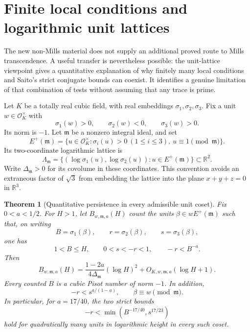 \documentclass[11pt,a4paper]{article}
\newtheorem{theorem}{Theorem}[section]
\theoremstyle{definition}\newtheorem{definition}[theorem]{Definition}
\theoremstyle{remark}\newtheorem{remark}[theorem]{Remark}
\begin{document}
\section{Finite local conditions and logarithmic unit lattices}
\label{pis:transfer:sec:rayunits}

The new non-Mills material does not supply an additional proved route to
Mills transcendence. A useful transfer is nevertheless possible: the
unit-lattice viewpoint gives a quantitative explanation of why finitely
many local conditions and Saito's strict conjugate bounds can coexist.
It identifies a genuine limitation of that combination of tests without
assuming that any trace is prime.

Let $K$ be a totally real cubic field, with real embeddings
$\sigma_1,\sigma_2,\sigma_3$. Fix a unit $w\in\mathcal O_K^\times$ with
\[
 \sigma_1(w)>0,\qquad \sigma_2(w)<0,\qquad \sigma_3(w)>0.
\]
Its norm is $-1$. Let $\mathfrak m$ be a nonzero integral ideal, and set
\[
 E^+(\mathfrak m)=
 \{u\in\mathcal O_K^\times:
       \sigma_i(u)>0\ (1\le i\le3),\ u\equiv1\pmod{\mathfrak m}\}.
\]
Its two-coordinate logarithmic lattice is
\[
 \Lambda_{\mathfrak m}=
 \{(\log\sigma_1(u),\log\sigma_2(u)):u\in E^+(\mathfrak m)\}
 \subset\mathbb R^2.
\]
Write $\Delta_{\mathfrak m}>0$ for its covolume in these coordinates.
This convention avoids an extraneous factor of $\sqrt3$ from embedding
the lattice into the plane $x+y+z=0$ in $\mathbb R^3$.

\begin{theorem}[Quantitative persistence in every admissible unit coset]
\label{pis:transfer:thm:ray}
Fix $0<a<1/2$. For $H>1$, let $B_{w,\mathfrak m,a}(H)$ count the units
$\beta\in wE^+(\mathfrak m)$ such that, on writing
\[
 B=\sigma_1(\beta),\qquad r=\sigma_2(\beta),\qquad
 s=\sigma_3(\beta),
\]
one has
\[
 1<B\le H,\qquad 0<s<-r<1,\qquad -r<B^{-a}.
\]
Then
\begin{equation}\label{pis:transfer:eq:count}
 B_{w,\mathfrak m,a}(H)
 =\frac{1-2a}{4\Delta_{\mathfrak m}}(\log H)^2
     +O_{K,w,\mathfrak m,a}(\log H+1).
\end{equation}
Every counted $B$ is a cubic Pisot number of norm $-1$. In addition,
\[
 -r<s^{a/(1-a)},\qquad \beta\equiv w\pmod{\mathfrak m}.
\]
In particular, for $a=17/40$, the two strict bounds
\[
 -r<\min(B^{-17/40},s^{17/23})
\]
hold for quadratically many units in logarithmic height in every such
coset.
\end{theorem}
\end{document}
